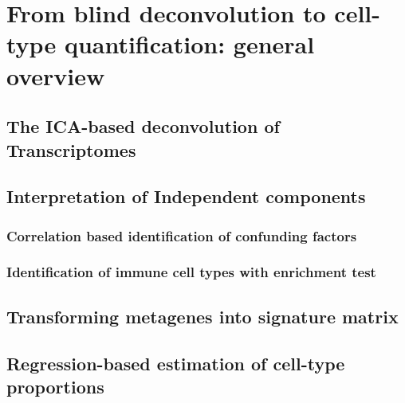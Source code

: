 \documentclass[12pt,]{book}
\theoremstyle{definition}
\theoremstyle{definition}
\theoremstyle{definition}
\theoremstyle{remark}
\begin{document}
\hypertarget{from-blind-deconvolution-to-cell-type-quantification-general-overview}{%
\section{From blind deconvolution to cell-type quantification: general
overview}\label{from-blind-deconvolution-to-cell-type-quantification-general-overview}}

\hypertarget{the-ica-based-deconvolution-of-transcriptomes}{%
\subsection{The ICA-based deconvolution of
Transcriptomes}\label{the-ica-based-deconvolution-of-transcriptomes}}

\hypertarget{interpretation-of-independent-components}{%
\subsection{Interpretation of Independent
components}\label{interpretation-of-independent-components}}

\hypertarget{correlation-based-identification-of-confunding-factors}{%
\subsubsection{Correlation based identification of confunding
factors}\label{correlation-based-identification-of-confunding-factors}}

\hypertarget{identification-of-immune-cell-types-with-enrichment-test}{%
\subsubsection{Identification of immune cell types with enrichment
test}\label{identification-of-immune-cell-types-with-enrichment-test}}

\hypertarget{transforming-metagenes-into-signature-matrix}{%
\subsection{Transforming metagenes into signature
matrix}\label{transforming-metagenes-into-signature-matrix}}

\hypertarget{regression-based-estimation-of-cell-type-proportions}{%
\subsection{Regression-based estimation of cell-type
proportions}\label{regression-based-estimation-of-cell-type-proportions}}
\end{document}
